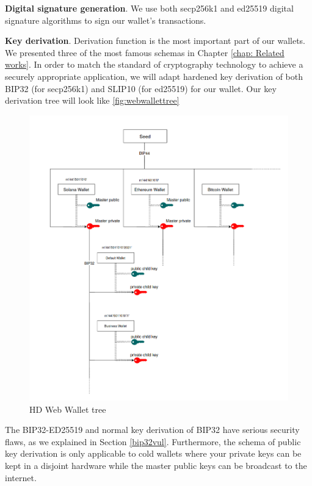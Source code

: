 \bigskip
{\textbf{Digital signature generation}}. We use both secp256k1 and ed25519 digital signature algorithms to sign our wallet’s transactions.

\bigskip
{\textbf{Key derivation}}. Derivation function is the most important part of our wallets. We presented three of the most famous schemas in Chapter \ref{chap: Related works}. In order to match the standard of cryptography technology to achieve a securely appropriate application, we will adapt hardened key derivation of both BIP32 (for secp256k1) and SLIP10 (for ed25519) for our wallet.
Our key derivation tree will look like \autoref{fig:webwallettree}

\begin{figure}[!ht]
    \centering
    \includegraphics[width=1\textwidth]{images/tree_web_wallet.png}
    \caption[HD Web Wallet tree]{HD Web Wallet tree}
    \label{fig:webwallettree}
\end{figure}

The BIP32-ED25519 and normal key derivation of BIP32 have serious security flaws, as we explained in Section \ref{bip32vul}. Furthermore, the schema of public key derivation is only applicable to cold wallets where your private keys can be kept in a disjoint hardware while the master public keys can be broadcast to the internet.


